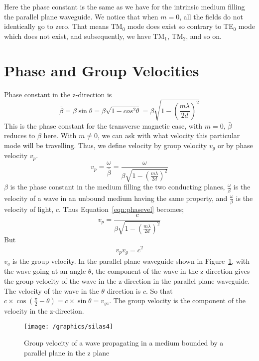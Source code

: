 Here the phase constant is the same as we have for the intrinsic medium filling the parallel plane waveguide. We notice that when $m = 0$, all the fields do not identically go to zero. That means TM$_0$ mode does exist so contrary to TE$_0$ mode which does not exist, and subsequently, we have TM$_{1}$, TM$_{2}$, and so on. 

\section{Phase and Group Velocities}
Phase constant in the z-direction is
\begin{dmath*}
\bar{\beta} = \beta\sin\theta = \beta \sqrt{1- cos^{2}\theta} =\beta\sqrt{1 - \left(\frac{m\lambda}{2d}\right)^{2}}
\end{dmath*}
This is the phase constant for the transverse magnetic case, with $m = 0$, $\bar{\beta}$ reduces to $\beta$ here. With $m\neq 0$, we can ask with what velocity this particular mode will be travelling. Thus, we define velocity by group velocity $v_{g}$ or by phase velocity $v_{p}$. 
\begin{dmath}
 v_{p}=\frac{\omega}{\bar{\beta}} =\frac{\omega}{\beta \sqrt{1 - \left(\frac{m\lambda}{2d}\right)^{2}}}
\label{eqn:phasevel}
\end{dmath}
$\beta$ is the phase constant in the medium filling the two conducting planes, $\frac{\omega}{\beta}$ is the velocity of a wave in an unbound medium having the same property, and $\frac{\omega}{\beta}$ is the velocity of light, $c$. Thus Equation~\ref{eqn:phasevel} becomes;
\begin{equation*}
v_{p} =\frac{c}{\beta\sqrt{1 - \left(\frac{m\lambda}{2d}\right)^{2}}}
\end{equation*}
But 
\begin{align}
v_{p} v_{g}= c^{2}
\label{eqn:grpvel}
\end{align}
$v_{g}$ is the group velocity. In the parallel plane waveguide shown in Figure~\ref{fig:silas4}, with the wave going at an angle $\theta$, the component of the wave in the z-direction gives the group velocity of the wave in the z-direction in the parallel plane waveguide. The velocity of the wave in the $\theta$ direction is $c$. So that $c\times \cos(\frac{\pi}{2} - \theta)= c\times \sin\theta= v_{gz}$. The group velocity is the component of the velocity in the z-direction.
\begin{figure}[h]
\centering
\texttt{[image: /graphics/silas4]}
\caption{Group velocity of a wave propagating in a medium bounded by a parallel plane in the z plane}
\label{fig:silas4}
\end{figure}
